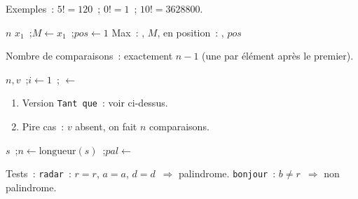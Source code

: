 Exemples~: $5!=120$~; $0!=1$~; $10!=3628800$.


\begin{algorithm}[H]
\caption{Maximum et sa position}
\Lire $n$\;
\Lire $x_1$~;\quad $M \leftarrow x_1$~;\quad $\mathit{pos} \leftarrow 1$\;
\Afficher \og Max~: \fg, $M$, \og en position~: \fg, $\mathit{pos}$\;
\end{algorithm}

Nombre de comparaisons~: exactement $n-1$ (une par \'el\'ement apr\`es le premier).


\begin{algorithm}[H]
\caption{Recherche lin\'eaire}
\Lire $n, v$~;\quad $i \leftarrow 1$~;\quad {} $\leftarrow$ \Faux\;
\end{algorithm}

\begin{enumerate}
  \item Version \texttt{Tant que}~: voir ci-dessus.
  \item Pire cas~: $v$ absent, on fait $n$ comparaisons.
\end{enumerate}


\begin{algorithm}[H]
\caption{Test palindrome}
\Lire $s$~;\quad $n \leftarrow \text{longueur}(s)$~;\quad $\mathit{pal} \leftarrow$ \Vrai\;
\end{algorithm}

Tests~: \texttt{radar}~: $r=r$, $a=a$, $d=d$~$\Rightarrow$ palindrome.
\texttt{bonjour}~: $b\ne r$~$\Rightarrow$ non palindrome.

